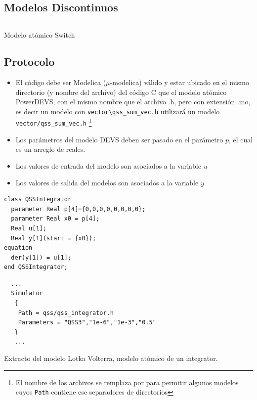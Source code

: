 \documentclass{beamer}
\begin{document}
\subsection{Modelos Discontinuos}
\begin{frame}[fragile]
\begin{listing}[H]
        \inputminted[]{modelica}{../../data/qss/qss_switch.mo}
        \caption{Modelo atómico Switch}\label{lst:qss_switch.mo}
\end{listing}
\end{frame}

\subsection{Protocolo}
\begin{frame}[fragile]
\begin{itemize}
        \item El código debe ser Modelica ($\mu$-modelica) válido y estar ubicado en el mismo directorio (y nombre del archivo) del código C que el modelo atómico 
        PowerDEVS, con el mismo nombre que el archivo .h, pero con extensión .mo, es decir un modelo con \texttt{vector\textbackslash qss\_sum\_vec.h} 
	utilizará un modelo \texttt{vector/qss\_sum\_vec.h} \footnote{El nombre de los archivos se remplaza \quotes{\textbackslash} por \quotes{/} para permitir 
	algunos modelos cuyos \texttt{Path} contiene ese separadores de directorios}
        \item Los parámetros del modelo DEVS deben ser pasado en el parámetro $p$, el cual es un arreglo de reales. 
        \item Los valores de entrada del modelo son asociados a la variable $u$
        \item Los valores de salida del modelos son asociados a la variable $y$
\end{itemize}
\end{frame}

\begin{frame}[fragile]
\begin{verbatim}
class QSSIntegrator
  parameter Real p[4]={0,0,0,0,0,0,0,0};
  parameter Real x0 = p[4];
  Real u[1];
  Real y[1](start = {x0});
equation
  der(y[1]) = u[1];
end QSSIntegrator;
\end{verbatim}
\end{frame}

\begin{frame}[fragile]
\begin{listing}[H]
\begin{verbatim}
  ...
  Simulator
   {
    Path = qss/qss_integrator.h
    Parameters = "QSS3","1e-6","1e-3","0.5"
   }
   ...
\end{verbatim}
\caption{Extracto del modelo Lotka Volterra, modelo atómico de un integrator.}\label{lst:qssint.pds}
\end{listing}
\end{frame}
\end{document}
